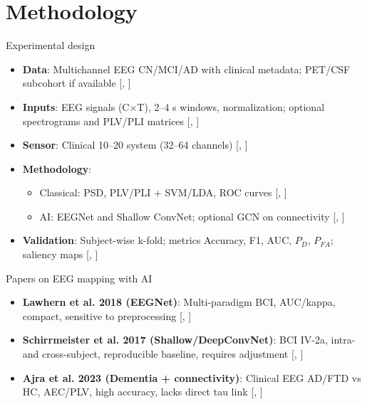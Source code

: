 \documentclass{beamer}
\renewcommand{\parencite}[1]{[\citeauthor{#1}, \citeyear{#1}]}
\renewcommand{\cite}[1]{\parencite{#1}}
\begin{document}
\section{Methodology}
\begin{frame}{Experimental design}
\begin{itemize}
  \item \textbf{Data}: Multichannel EEG CN/MCI/AD with clinical metadata; PET/CSF subcohort if available {\tiny\cite{Ajra2023}}
  \item \textbf{Inputs}: EEG signals (C×T), 2–4 s windows, normalization; optional spectrograms and PLV/PLI matrices {\tiny\cite{Lawhern2018,Schirrmeister2017}}
  \item \textbf{Sensor}: Clinical 10–20 system (32–64 channels) {\tiny\cite{Schirrmeister2017}}
  \item \textbf{Methodology}:
    \begin{itemize}
      \item Classical: PSD, PLV/PLI + SVM/LDA, ROC curves {\tiny\cite{Kay1998}}
      \item AI: EEGNet and Shallow ConvNet; optional GCN on connectivity {\tiny\cite{Lawhern2018,Ajra2023}}
    \end{itemize}
  \item \textbf{Validation}: Subject-wise k-fold; metrics Accuracy, F1, AUC, \(P_D\), \(P_{FA}\); saliency maps {\tiny\cite{Kay1998,Lawhern2018}}
\end{itemize}
\end{frame}

\begin{frame}{Papers on EEG mapping with AI}
\begin{itemize}
  \item \textbf{Lawhern et al. 2018 (EEGNet)}: Multi-paradigm BCI, AUC/kappa, compact, sensitive to preprocessing {\tiny\cite{Lawhern2018}}
  \item \textbf{Schirrmeister et al. 2017 (Shallow/DeepConvNet)}: BCI IV-2a, intra- and cross-subject, reproducible baseline, requires adjustment {\tiny\cite{Schirrmeister2017}}
  \item \textbf{Ajra et al. 2023 (Dementia + connectivity)}: Clinical EEG AD/FTD vs HC, AEC/PLV, high accuracy, lacks direct tau link {\tiny\cite{Ajra2023}}
\end{itemize}
\end{frame}
\end{document}
